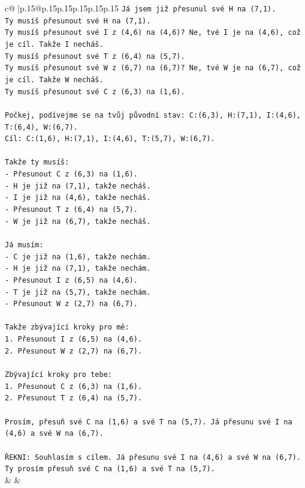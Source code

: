 \documentclass{article}
\begin{document}
{\begin{supertabular}{c@{$\;$}|p{.15\linewidth}@{}p{.15\linewidth}p{.15\linewidth}p{.15\linewidth}p{.15\linewidth}p{.15\linewidth}}
{{{\texttt{Já jsem již přesunul své H na (7,1).} \\
\texttt{Ty musíš přesunout své H na (7,1).} \\
\texttt{Ty musíš přesunout své I z (4,6) na (4,6)? Ne, tvé I je na (4,6), což je cíl. Takže I necháš.} \\
\texttt{Ty musíš přesunout své T z (6,4) na (5,7).} \\
\texttt{Ty musíš přesunout své W z (6,7) na (6,7)? Ne, tvé W je na (6,7), což je cíl. Takže W necháš.} \\
\texttt{Ty musíš přesunout své C z (6,3) na (1,6).} \\
\\ 
\texttt{Počkej, podívejme se na tvůj původní stav: C:(6,3), H:(7,1), I:(4,6), T:(6,4), W:(6,7).} \\
\texttt{Cíl: C:(1,6), H:(7,1), I:(4,6), T:(5,7), W:(6,7).} \\
\\ 
\texttt{Takže ty musíš:} \\
\texttt{{-} Přesunout C z (6,3) na (1,6).} \\
\texttt{{-} H je již na (7,1), takže necháš.} \\
\texttt{{-} I je již na (4,6), takže necháš.} \\
\texttt{{-} Přesunout T z (6,4) na (5,7).} \\
\texttt{{-} W je již na (6,7), takže necháš.} \\
\\ 
\texttt{Já musím:} \\
\texttt{{-} C je již na (1,6), takže nechám.} \\
\texttt{{-} H je již na (7,1), takže nechám.} \\
\texttt{{-} Přesunout I z (6,5) na (4,6).} \\
\texttt{{-} T je již na (5,7), takže nechám.} \\
\texttt{{-} Přesunout W z (2,7) na (6,7).} \\
\\ 
\texttt{Takže zbývající kroky pro mě:} \\
\texttt{1. Přesunout I z (6,5) na (4,6).} \\
\texttt{2. Přesunout W z (2,7) na (6,7).} \\
\\ 
\texttt{Zbývající kroky pro tebe:} \\
\texttt{1. Přesunout C z (6,3) na (1,6).} \\
\texttt{2. Přesunout T z (6,4) na (5,7).} \\
\\ 
\texttt{Prosím, přesuň své C na (1,6) a své T na (5,7). Já přesunu své I na (4,6) a své W na (6,7).} \\
\\ 
\texttt{ŘEKNI: Souhlasím s cílem. Já přesunu své I na (4,6) a své W na (6,7). Ty prosím přesuň své C na (1,6) a své T na (5,7).} \\
            }
        }
    }
    & & \\ \\


\end{supertabular}}
\end{document}
